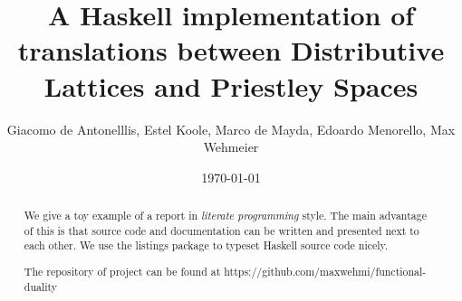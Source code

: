 \documentclass[12pt,a4paper]{article}
\title{A Haskell implementation of translations between Distributive Lattices and Priestley Spaces}
\author{Giacomo de Antonelllis, Estel Koole, Marco de Mayda, Edoardo Menorello, Max Wehmeier}
\date{\today}
\begin{document}
\maketitle

\begin{abstract}
We give a toy example of a report in \emph{literate programming} style.
The main advantage of this is that source code and documentation can
be written and presented next to each other.
We use the listings package to typeset Haskell source code nicely.

The repository of project can be found at https://github.com/maxwehmi/functional-duality
\end{abstract}

\vfill

\tableofcontents

\clearpage


















\end{document}
